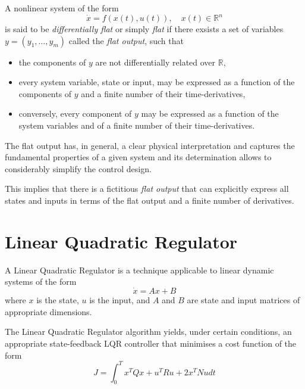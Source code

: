 \par A nonlinear system of the form
\begin{equation}
    \dot{x} = f(x(t),u(t)), \quad x(t) \in \mathbb{R}^n
\end{equation}
is said to be \textit{differentially flat} \cite{fliess1995flatness} or simply \textit{flat} if there exsists a set of variables $y = (y_1, \dots, y_m)$ called the \textit{flat output}, such that
\begin{itemize}
    \item the components of $y$ are not differentially related over $\mathbb{R}$,
    \item every system variable, state or input, may be expressed as a function of the components of $y$ and a finite number of their time-derivatives,
    \item conversely, every component of $y$ may be expressed as a function of the system variables and of a finite number of their time-derivatives. 
\end{itemize}

\par The flat output has, in general, a clear physical interpretation and captures the fundamental properties of a given system and its determination allows to considerably simplify the control design. 
\par This implies that there is a fictitious \textit{flat output} that can explicitly express all states and inputs in terms of the flat output and a finite number of derivatives. 

\section{Linear Quadratic Regulator}

\par A Linear Quadratic Regulator is a technique applicable to linear dynamic systems of the form
\begin{equation}
    \label{eq:dynamic_system}
    \dot{x} = A x + B
\end{equation}
where $x$ is the state, $u$ is the input, and $A$ and $B$ are state and input matrices of appropriate dimensions. 

\par The Linear Quadratic Regulator algorithm yields, under certain conditions, an appropriate state-feedback LQR controller that minimises a cost function of the form
\begin{equation}
    \label{eq:quadratic_cost}
    J = \int_0^T x^T Q x + u^T R u + 2x^T N u dt
\end{equation}

